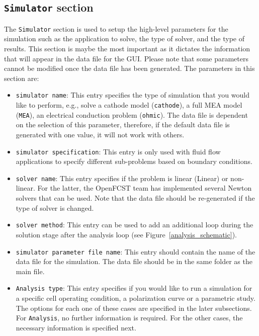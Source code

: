 \subsection{\texttt{Simulator} section}
The \texttt{Simulator} section is used to setup the high-level parameters for the simulation such as the application to solve, the type of solver, and the type of results. This section is maybe the most important as it dictates the information that will appear in the data file for the GUI. Please note that some parameters cannot be modified once the data file has been generated. The parameters in this section are:
\begin{itemize}
 \item \texttt{simulator name}: This entry specifies the type of simulation that you would like to perform, e.g., solve a cathode model (\texttt{cathode}), a full MEA model (\texttt{MEA}), an electrical conduction problem (\texttt{ohmic}). The data file is dependent on the selection of this parameter, therefore, if the default data file is generated with one value, it will not work with others.
 \item \texttt{simulator specification}: This entry is only used with fluid flow applications to specify different sub-problems based on boundary conditions.
 \item \texttt{solver name}: This entry specifies if the problem is linear (Linear) or non-linear. For the latter, the OpenFCST team has implemented several Newton solvers that can be used. Note that the data file should be re-generated if the type of solver is changed.
 \item \texttt{solver method}: This entry can be used to add an additional loop during the solution stage after the analysis loop (see Figure~\ref{analysis_schematic}).
 \item \texttt{simulator parameter file name}: This entry should contain the name of the data file for the simulation. The data file should be in the same folder as the main file.
 \item \texttt{Analysis type}: This entry specifies if you would like to run a simulation for a specific cell operating condition, a polarization curve or a parametric study. The options for each one of these cases are specified in the later subsections. For \texttt{Analysis}, no further information is required. For the other cases, the necessary information is specified next.
\end{itemize}

